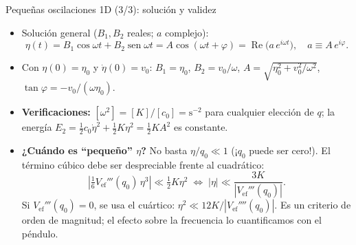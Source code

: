 \documentclass[spanish]{beamer}
\newcommand{\Vef}{V_{\mathrm{ef}}}
\begin{document}
\begin{frame}{Pequeñas oscilaciones 1D (3/3): solución y validez}
\small
\begin{itemize}
\item<1-> Solución general ($B_1,B_2$ reales; $a$ complejo):
\[
\eta(t)=B_1\cos\omega t+B_2\operatorname{sen}\omega t=A\cos(\omega t+\varphi)=\operatorname{Re}\!\big(a\,e^{i\omega t}\big),\quad a\equiv A\,e^{i\varphi}.
\]
\item<2-> Con $\eta(0)=\eta_0$ y $\dot\eta(0)=v_0$: $B_1=\eta_0$, $B_2=v_0/\omega$, $A=\sqrt{\eta_0^2+v_0^2/\omega^2}$, $\tan\varphi=-v_0/(\omega\eta_0)$.
\item<3-> \textbf{Verificaciones:} $[\omega^2]=[K]/[c_0]=\mathrm{s}^{-2}$ para cualquier elección de $q$; la energía $E_2=\tfrac12 c_0\dot\eta^2+\tfrac12K\eta^2=\tfrac12 KA^2$ es constante.
\item<4-> \textbf{¿Cuándo es ``pequeño'' $\eta$?} No basta $\eta/q_0\ll1$ (¡$q_0$ puede ser cero!). El término cúbico debe ser despreciable frente al cuadrático:
\[
\left|\tfrac16\Vef'''(q_0)\,\eta^3\right|\ll\tfrac12 K\eta^2
\;\iff\;
|\eta|\ll \frac{3K}{|\Vef'''(q_0)|}.
\]
Si $\Vef'''(q_0)=0$, se usa el cuártico: $\eta^2\ll 12K/|\Vef''''(q_0)|$. Es un criterio de orden de magnitud; el efecto sobre la frecuencia lo cuantificamos con el péndulo.
\end{itemize}
\end{frame}

\end{document}
